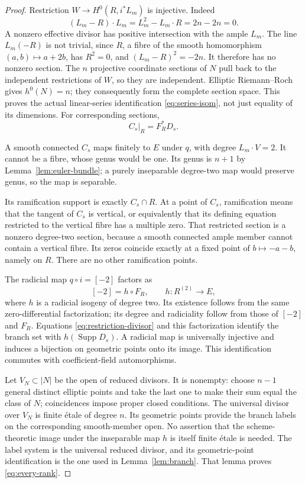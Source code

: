 \documentclass[11pt]{article}
\theoremstyle{remark}\newtheorem{remark}[theorem]{Remark}
\begin{document}
\begin{proof}
Restriction $W\to H^0(R,i^*L_m)$ is injective. Indeed
\[
 (L_m-R)\cdot L_m=L_m^2-L_m\cdot R=2n-2n=0.
\]
A nonzero effective divisor has positive intersection with the ample $L_m$. The line $L_m(-R)$ is not trivial, since $R$, a fibre of the smooth homomorphism $(a,b)\mapsto a+2b$, has $R^2=0$, and $(L_m-R)^2=-2n$. It therefore has no nonzero section. The $n$ projective coordinate sections of $N$ pull back to the independent restrictions of $W$, so they are independent. Elliptic Riemann--Roch gives $h^0(N)=n$; they consequently form the complete section space. This proves the actual linear-series identification \eqref{eq:series-isom}, not just equality of its dimensions. For corresponding sections,
\begin{equation}\label{eq:restriction-divisor}
                             C_s|_R=F_R^*D_s.
\end{equation}

A smooth connected $C_s$ maps finitely to $E$ under $q$, with degree $L_m\cdot V=2$. It cannot be a fibre, whose genus would be one. Its genus is $n+1$ by Lemma~\ref{lem:euler-bundle}; a purely inseparable degree-two map would preserve genus, so the map is separable.

Its ramification support is exactly $C_s\cap R$. At a point of $C_s$, ramification means that the tangent of $C_s$ is vertical, or equivalently that its defining equation restricted to the vertical fibre has a multiple zero. That restricted section is a nonzero degree-two section, because a smooth connected ample member cannot contain a vertical fibre. Its zeros coincide exactly at a fixed point of $b\mapsto-a-b$, namely on $R$. There are no other ramification points.

The radicial map $q\circ i=[-2]$ factors as
\[
                         [-2]=h\circ F_R,
                         \qquad h:R^{(2)}\to E,
\]
where $h$ is a radicial isogeny of degree two. Its existence follows from the same zero-differential factorization; its degree and radiciality follow from those of $[-2]$ and $F_R$. Equations \eqref{eq:restriction-divisor} and this factorization identify the branch set with $h(\operatorname{Supp}D_s)$. A radicial map is universally injective and induces a bijection on geometric points onto its image. This identification commutes with coefficient-field automorphisms.

Let $V_N\subset|N|$ be the open of reduced divisors. It is nonempty: choose $n-1$ general distinct elliptic points and take the last one to make their sum equal the class of $N$; coincidences impose proper closed conditions. The universal divisor over $V_N$ is finite \'etale of degree $n$. Its geometric points provide the branch labels on the corresponding smooth-member open. No assertion that the scheme-theoretic image under the inseparable map $h$ is itself finite \'etale is needed. The label system is the universal reduced divisor, and its geometric-point identification is the one used in Lemma~\ref{lem:branch}. That lemma proves \eqref{eq:every-rank}.
\end{proof}
\end{document}
